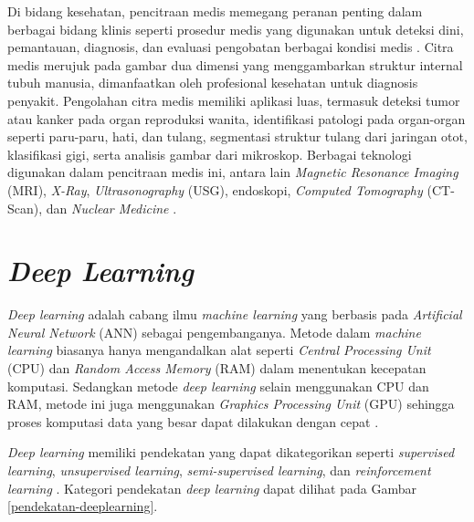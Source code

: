 \par Di bidang kesehatan, pencitraan medis memegang peranan penting dalam berbagai bidang klinis seperti prosedur medis yang digunakan untuk deteksi dini, pemantauan, diagnosis, dan evaluasi pengobatan berbagai kondisi medis \citep{puttagunta2021medical}. Citra medis merujuk pada gambar dua dimensi yang menggambarkan struktur internal tubuh manusia, dimanfaatkan oleh profesional kesehatan untuk diagnosis penyakit. Pengolahan citra medis memiliki aplikasi luas, termasuk deteksi tumor atau kanker pada organ reproduksi wanita, identifikasi patologi pada organ-organ seperti paru-paru, hati, dan tulang, segmentasi struktur tulang dari jaringan otot, klasifikasi gigi, serta analisis gambar dari mikroskop. Berbagai teknologi digunakan dalam pencitraan medis ini, antara lain \textit{Magnetic Resonance Imaging} (MRI), \textit{X-Ray}, \textit{Ultrasonography} (USG), endoskopi, \textit{Computed Tomography} (CT-Scan), dan \textit{Nuclear Medicine} \citep{kusuma2018penerapan}. 


\section{\textit{Deep Learning}} 

\par \textit{Deep learning} adalah cabang ilmu \textit{machine learning} yang berbasis pada \textit{Artificial Neural Network} (ANN) sebagai pengembanganya. Metode dalam \textit{machine learning} biasanya hanya mengandalkan alat seperti \textit{Central Processing Unit} (CPU) dan \textit{Random Access Memory} (RAM) dalam menentukan kecepatan komputasi. Sedangkan metode \textit{deep learning} selain menggunakan CPU dan RAM, metode ini juga menggunakan \textit{Graphics Processing Unit} (GPU) sehingga proses komputasi data yang besar dapat dilakukan dengan cepat \citep{ilahiyah2018implementasi}.

\par \textit{Deep learning} memiliki pendekatan yang dapat dikategorikan seperti \textit{supervised learning}, \textit{unsupervised learning}, \textit{semi-supervised learning}, dan \textit{reinforcement learning} \citep{alom2019state}. Kategori pendekatan \textit{deep learning} dapat dilihat pada Gambar \ref{pendekatan-deeplearning}.


